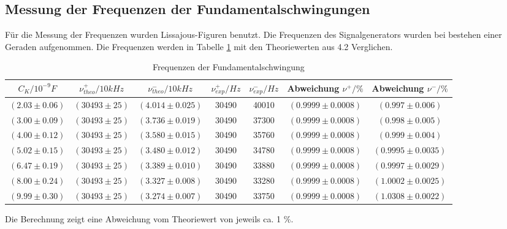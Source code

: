 \documentclass[11pt,ngerman,a4paper]{article}
\begin{document}
\subsection{Messung der Frequenzen der Fundamentalschwingungen}
Für die Messung der Frequenzen wurden Lissajous-Figuren benutzt. Die Frequenzen des Signalgenerators wurden bei bestehen einer Geraden aufgenommen. Die Frequenzen werden in Tabelle \ref{AufgabeB} mit den Theoriewerten aus 4.2 Verglichen.
\begin{table}[h] 
\hspace{-1.9cm}
\begin{tabular}{|c|c|c|c|c|c|c|}
\hline
$C_K / 10^{-9}F$ & $\nu_{theo}^+/10kHz$ & $\nu_{theo}^-/10kHz$ & $\nu_{exp}^+/Hz$ & $\nu_{exp}^-/Hz$ & Abweichung $\nu^+/\%$ & Abweichung $\nu^-/\%$ \\
\hline
$(2.03\pm0.06)$ & $(30493\pm25)$ & $(4.014\pm0.025)$ & 30490 & 40010 & $(0.9999\pm0.0008)$ & $(0.997\pm0.006)$\\
$(3.00\pm0.09)$& $(30493\pm25)$ & $(3.736\pm0.019)$ & 30490 & 37300 & $(0.9999\pm0.0008)$ & $(0.998\pm0.005)$\\
$(4.00\pm0.12)$& $(30493\pm25)$ & $(3.580\pm0.015)$ & 30490 & 35760 & $(0.9999\pm0.0008)$ & $(0.999\pm0.004)$\\
$(5.02\pm0.15)$& $(30493\pm25)$ & $(3.480\pm0.012)$ & 30490 & 34780 & $(0.9999\pm0.0008)$ & $(0.9995\pm0.0035)$\\
$(6.47\pm0.19)$& $(30493\pm25)$ & $(3.389\pm0.010)$ & 30490 & 33880 & $(0.9999\pm0.0008)$ & $(0.9997\pm0.0029)$\\
$(8.00\pm0.24)$& $(30493\pm25)$ & $(3.327\pm0.008)$ & 30490 & 33280 & $(0.9999\pm0.0008)$ & $(1.0002\pm0.0025)$\\
$(9.99\pm0.30)$& $(30493\pm25)$ & $(3.274\pm0.007)$ & 30490 & 33750 & $(0.9999\pm0.0008)$ & $(1.0308\pm0.0022)$\\
\hline
\end{tabular}
\caption{Frequenzen der Fundamentalschwingung}
\label{AufgabeB}
\end{table}
Die Berechnung zeigt eine Abweichung vom Theoriewert von jeweils ca. 1 \%.
\end{document}
